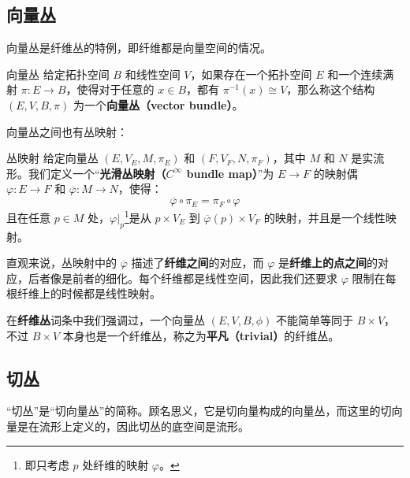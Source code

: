 \begin{issues}
\issueDraft
\end{issues}


\subsection{向量丛}


向量丛是纤维丛的特例，即纤维都是向量空间的情况。

\begin{definition}{向量丛}
给定拓扑空间 $B$ 和线性空间 $V$，如果存在一个拓扑空间 $E$ 和一个连续满射 $\pi:E\rightarrow B$，使得对于任意的 $x\in B$，都有 $\pi^{-1}(x)\cong V$，那么称这个结构 $(E, V, B, \pi)$ 为一个\textbf{向量丛（vector bundle）}。
\end{definition}

向量丛之间也有丛映射：

\begin{definition}{丛映射}
给定向量丛 $(E, V_E, M, \pi_E)$ 和 $(F, V_F, N, \pi_F)$，其中 $M$ 和 $N$ 是实流形。我们定义一个“\textbf{光滑丛映射（$C^\infty$ bundle map）}”为 $E\rightarrow F$ 的映射偶 $\varphi: E\rightarrow F$ 和 $\overline{\varphi}: M\rightarrow N$，使得：
\begin{equation}
\overline{\varphi}\circ\pi_E=\pi_F\circ\varphi
\end{equation}
且在任意 $p\in M$ 处，$\varphi|_p$\footnote{即只考虑 $p$ 处纤维的映射 $\varphi$。}是从 $p\times V_E$ 到 $\overline{\varphi}(p)\times V_F$ 的映射，并且是一个线性映射。
\end{definition}

直观来说，丛映射中的 $\overline{\varphi}$ 描述了\textbf{纤维之间}的对应，而 $\varphi$ 是\textbf{纤维上的点之间}的对应，后者像是前者的细化。每个纤维都是线性空间，因此我们还要求 $\varphi$ 限制在每根纤维上的时候都是线性映射。

在\textbf{纤维丛}词条中我们强调过，一个向量丛 $(E, V, B, \phi)$ 不能简单等同于 $B\times V$，不过 $B\times V$ 本身也是一个纤维丛，称之为\textbf{平凡（trivial）}的纤维丛。




\subsection{切丛}
“切丛”是“切向量丛”的简称。顾名思义，它是切向量构成的向量丛，而这里的切向量是在流形上定义的，因此切丛的底空间是流形。

